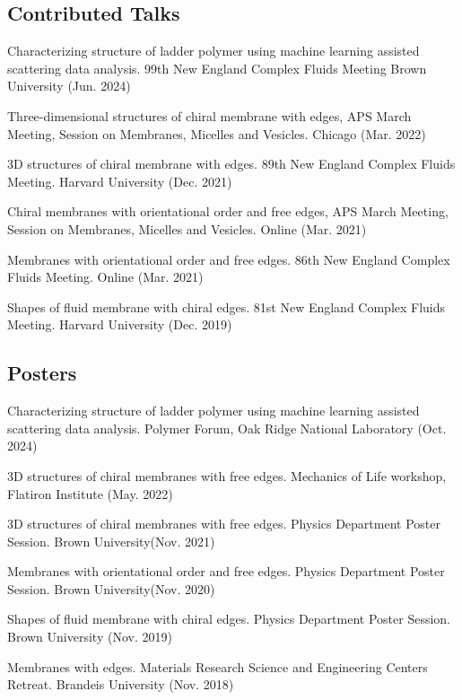 \documentclass[11pt,letterpaper]{article}
\begin{document}
\subsection*{Contributed Talks}
\begin{etaremune}
    \item Characterizing structure of ladder polymer using machine learning assisted scattering data analysis. 99th New England Complex Fluids Meeting Brown University (Jun. 2024)
    \item Three-dimensional structures of chiral membrane with edges, APS March Meeting, Session on Membranes, Micelles and Vesicles. Chicago (Mar. 2022)
    \item 3D structures of chiral membrane with edges. 89th New England Complex Fluids Meeting. Harvard University (Dec. 2021)
    \item Chiral membranes with orientational order and free edges, APS March Meeting, Session on Membranes, Micelles and Vesicles. Online (Mar. 2021)
    \item Membranes with orientational order and free edges. 86th New England Complex Fluids Meeting. Online (Mar. 2021)
    \item Shapes of fluid membrane with chiral edges. 81st New England Complex Fluids Meeting. Harvard University (Dec. 2019)
\end{etaremune}

\subsection*{Posters}
\begin{etaremune}
    \item Characterizing structure of ladder polymer using machine learning assisted scattering data analysis. Polymer Forum, Oak Ridge National Laboratory (Oct. 2024)
    \item 3D structures of chiral membranes with free edges. Mechanics of Life workshop, Flatiron Institute (May. 2022)
    \item 3D structures of chiral membranes with free edges. Physics Department Poster Session. Brown University(Nov. 2021)
    \item Membranes with orientational order and free edges. Physics Department Poster Session. Brown University(Nov. 2020)
    \item Shapes of fluid membrane with chiral edges. Physics Department Poster Session. Brown University (Nov. 2019)
    \item Membranes with edges. Materials Research Science and Engineering Centers Retreat. Brandeis University (Nov. 2018)
\end{etaremune}
\end{document}
